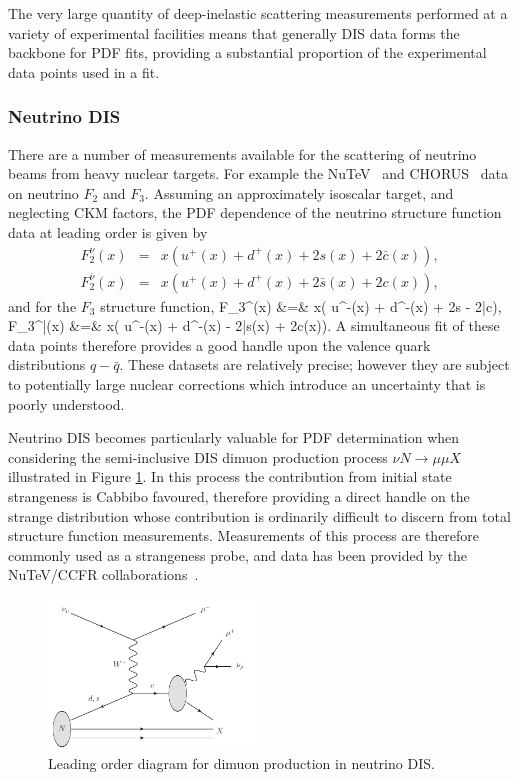 The very large quantity of deep-inelastic scattering measurements performed at a variety of experimental facilities means that generally DIS data forms the backbone for PDF fits, providing a substantial proportion of the experimental data points used in a fit.

\subsubsection{Neutrino DIS}
There are a number of measurements available for the scattering of neutrino beams from heavy nuclear targets. For example the NuTeV~\cite{Tzanov:2005kr} and CHORUS~\cite{Onengut:2005kv} data on neutrino $F_2$ and $F_3$. Assuming an approximately isoscalar target, and neglecting CKM factors, the PDF dependence of the neutrino structure function data at leading order is given by~\cite{Forte:2013wc}
\begin{eqnarray}
	F_2^\nu(x) &=& x\left( u^+(x) + d^+(x) + 2s(x) + 2\bar{c}(x)\right), \\
	F_2^{\bar{\nu}}(x) &=& x\left( u^+(x) + d^+(x) + 2\bar{s}(x) + 2c(x)\right),
\end{eqnarray}
and for the $F_3$ structure function,
\ba
	F_3^\nu(x) &=& x\left( u^-(x) + d^-(x) + 2s - 2\bar{c}\right), \\
	F_3^{\bar{\nu}}(x) &=& x\left( u^-(x) + d^-(x) - 2\bar{s}(x) + 2c(x)\right).
\ea
A simultaneous fit of these data points therefore provides a good handle upon the valence quark distributions $q-\bar{q}$. These datasets are relatively precise; however they are subject to potentially large nuclear corrections which introduce an uncertainty that is poorly understood.

Neutrino DIS becomes particularly valuable for PDF determination when considering the semi-inclusive DIS dimuon production process $\nu N \to \mu\mu X$ illustrated in Figure \ref{fig:dimuon}. In this process the contribution from initial state strangeness is Cabbibo favoured, therefore providing a direct handle on the strange distribution whose contribution is ordinarily difficult to discern from total structure function measurements. Measurements of this process are therefore commonly used as a strangeness probe, and data has been provided by the NuTeV/CCFR collaborations~\cite{Goncharov:2001qe}.
%
\begin{figure}[h]
\centering
\includegraphics[width=0.5\textwidth]{3-PDFdet/figs/dimuon.pdf}
\caption[Leading order diagram for dimuon production in neutrino DIS]{Leading order diagram for dimuon production in neutrino DIS.}
\label{fig:dimuon}
\end{figure}
%
